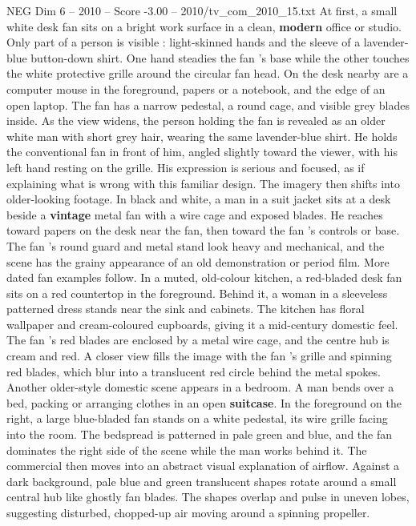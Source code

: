 \begin{textsample}{NEG Dim 6 – 2010 – Score -3.00 – 2010/tv\_com\_2010\_15.txt}  \label{ex:f6_neg_004}
At first, a small white desk fan sits on a bright work surface in a clean, \textbf{modern} office or studio.
Only part of a person is visible : light-skinned hands and the sleeve of a lavender-blue button-down shirt.
One hand steadies the fan ’s base while the other touches the white protective grille around the circular fan head.
On the desk nearby are a computer mouse in the foreground, papers or a notebook, and the edge of an open laptop.
The fan has a narrow pedestal, a round cage, and visible grey blades inside.
As the view widens, the person holding the fan is revealed as an older white man with short grey hair, wearing the same lavender-blue shirt.
He holds the conventional fan in front of him, angled slightly toward the viewer, with his left hand resting on the grille.
His expression is serious and focused, as if explaining what is wrong with this familiar design.
The imagery then shifts into older-looking footage.
In black and white, a man in a suit jacket sits at a desk beside a \textbf{vintage} metal fan with a wire cage and exposed blades.
He reaches toward papers on the desk near the fan, then toward the fan ’s controls or base.
The fan ’s round guard and metal stand look heavy and mechanical, and the scene has the grainy appearance of an old demonstration or period film.
More dated fan examples follow.
In a muted, old-colour kitchen, a red-bladed desk fan sits on a red countertop in the foreground.
Behind it, a woman in a sleeveless patterned dress stands near the sink and cabinets.
The kitchen has floral wallpaper and cream-coloured cupboards, giving it a mid-century domestic feel.
The fan ’s red blades are enclosed by a metal wire cage, and the centre hub is cream and red.
A closer view fills the image with the fan ’s grille and spinning red blades, which blur into a translucent red circle behind the metal spokes.
Another older-style domestic scene appears in a bedroom.
A man bends over a bed, packing or arranging clothes in an open \textbf{suitcase}.
In the foreground on the right, a large blue-bladed fan stands on a white pedestal, its wire grille facing into the room.
The bedspread is patterned in pale green and blue, and the fan dominates the right side of the scene while the man works behind it.
The commercial then moves into an abstract visual explanation of airflow.
Against a dark background, pale blue and green translucent shapes rotate around a small central hub like ghostly fan blades.
The shapes overlap and pulse in uneven lobes, suggesting disturbed, chopped-up air moving around a spinning propeller.

\end{textsample}
